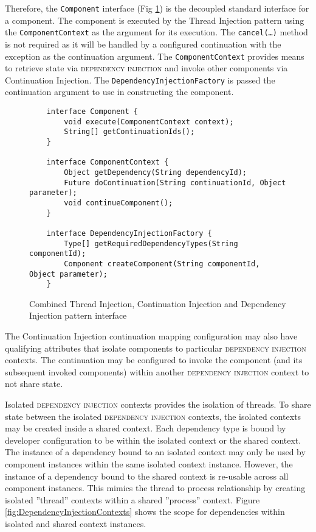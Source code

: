 \documentclass[prodmode]{style/acmlarge}
\begin{document}
Therefore, the \texttt{Component} interface (Fig
\ref{fig:IocInjectionInterfaces}) is the decoupled standard interface for a
component.  The component is executed by the Thread Injection pattern using the
\texttt{ComponentContext} as the argument for its execution.  The
\texttt{cancel(\ldots)} method is not required as it will be handled by a
configured continuation with the exception as the continuation argument.  The
\texttt{ComponentContext} provides means to retrieve state via
\textsc{dependency injection} and invoke other components via Continuation
Injection.  The \texttt{DependencyInjectionFactory} is passed the continuation
argument to use in constructing the component.

\begin{figure}[tp]
\centering
\begin{verbatim}
    interface Component {
        void execute(ComponentContext context);
        String[] getContinuationIds();
    }

    interface ComponentContext {
        Object getDependency(String dependencyId);
        Future doContinuation(String continuationId, Object parameter);
        void continueComponent();
    }
    
    interface DependencyInjectionFactory {
        Type[] getRequiredDependencyTypes(String componentId);
        Component createComponent(String componentId, Object parameter);
    }
\end{verbatim}
\caption{Combined Thread Injection, Continuation Injection and Dependency Injection pattern interface\footnotemark}
\label{fig:IocInjectionInterfaces}
\end{figure}


The Continuation Injection continuation mapping configuration may also
have qualifying attributes that isolate components to particular
\textsc{dependency injection} contexts.  The continuation may be configured to
invoke the component (and its subsequent invoked components) within another
\textsc{dependency injection} context to not share state.

Isolated \textsc{dependency injection} contexts provides the isolation of
threads.  To share state between the isolated \textsc{dependency injection}
contexts, the isolated contexts may be created inside a shared context.  Each
dependency type is bound by developer configuration to be within the isolated
context or the shared context.  The instance of a dependency bound to an
isolated context may only be used by component instances within the same
isolated context instance.  However, the instance of a dependency bound to the
shared context is re-usable across all component instances.  This mimics the
thread to process relationship by creating isolated ''thread'' contexts within a
shared ''process'' context.  Figure \ref{fig:DependencyInjectionContexts} shows
the scope for dependencies within isolated and shared context instances.
\end{document}
